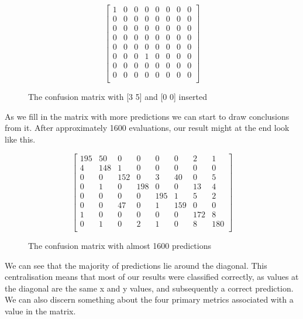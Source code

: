 \begin{figure}
	\myfontsize
    \centering
    \[
    \begin{bmatrix}
     1 & 0 &  0 &  0 &  0 &  0 &  0 &  0\\
     0 & 0 &  0 &  0 &  0 &  0 &  0 &  0\\
     0 & 0 &  0 &  0 &  0 &  0 &  0 &  0\\
     0 & 0 &  0 &  0 &  0 &  0 &  0 &  0\\
     0 & 0 &  0 &  0 &  0 &  0 &  0 &  0\\
     0 & 0 &  0 &  1 &  0 &  0 &  0 &  0\\
     0 & 0 &  0 &  0 &  0 &  0 &  0 &  0\\
     0 & 0 &  0 &  0 &  0 &  0 &  0 &  0\\
    \end{bmatrix}
    \]
    \caption{The confusion matrix with [3 5] and [0 0] inserted }
    \label{mat:nonemptyCM}
\end{figure}

As we fill in the matrix with more predictions we can start to draw conclusions from it. After approximately 1600 evaluations, our result might at the end look like this.
\begin{figure}
	\myfontsize
    \centering
    \[
    \begin{bmatrix}
     195 & 50 &  0 &  0 &  0 &  0 &  2  & 1\\
       4 & 148&  1 &  0 &  0 &  0 &  0  & 0\\
       0 &  0 & 152&  0 &  3 & 40 &  0  & 5\\
       0 &  1 &  0 &198 &  0 &  0 & 13  & 4\\
       0 &  0 &  0 & 0  &195 &  1 &  5  & 2\\
       0 &  0 & 47 & 0  &  1 &159 &  0  & 0\\
       1 &  0 &  0 & 0  &  0 &  0 & 172 &  8\\
       0 &  1 &  0 & 2  &  1 &  0 &  8  & 180\\
    \end{bmatrix}
    \]
    \caption{The confusion matrix with  almost 1600 predictions}
    \label{mat:FullCM}
\end{figure}
We can see that the majority of predictions lie around the diagonal. This centralisation means that most of our results were classified correctly, as values at the diagonal are the same x and y values, and subsequently a correct prediction. 
We can also discern something about the four primary metrics associated with a value in the matrix.\\

